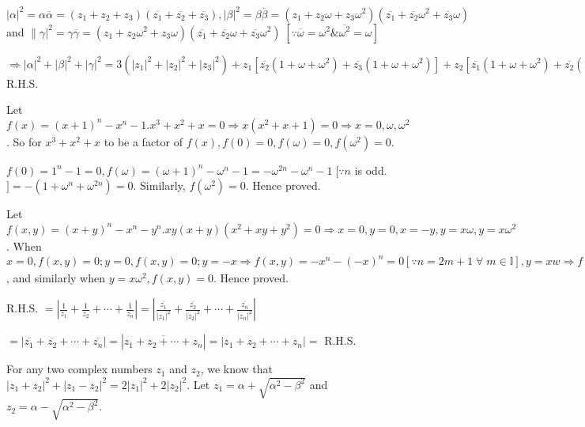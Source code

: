   $|\alpha|^2 = \alpha\overline{\alpha} = (z_1 + z_2 + z_3)(\overline{z_1} + \overline{z_2} +
  \overline{z_3}), |\beta|^2 = \beta\overline{\beta} = (z_1 + z_2\omega + z_3\omega^2)(\overline{z_1} +
  \overline{z_2}\omega^2 + \overline{z_3}\omega)$ and $\|\gamma|^2 = \gamma\overline{\gamma} = (z_1 +
  z_2\omega^2 + z_3\omega)(\overline{z_1} + \overline{z_2}\omega + \overline{z_3}\omega^2)\;[\because
    \overline{\omega} = \omega^2 \& \overline{\omega^2} = \omega]$

  $\Rightarrow |\alpha|^2 + |\beta|^2 + |\gamma|^2 = 3(|z_1|^2 + |z_2|^2 + |z_3|^2) + z_1[\overline{z_2}(1 +
    \omega + \omega^2) + \overline{z_3}(1 + \omega + \omega^2)] + z_2[\overline{z_1}(1 + \omega + \omega^2)
    + \overline{z_2}(1 + \omega + \omega^2)] + z_3[\overline{z_1}(1 + \omega + \omega^2) + \overline{z_2}(1
    + \omega + \omega^2)] = 3(|z_1|^2 + |z_2|^2 + |z_3|^2) =$ R.H.S.
\item Let $f(x) = (x + 1)^n - x^n - 1. x^3 + x^2 + x = 0 \Rightarrow x(x^2 + x + 1) = 0\Rightarrow x = 0,
  \omega, \omega^2$. So for $x^3 + x^2 + x$ to be a factor of $f(x), f(0) = 0, f(\omega) = 0, f(\omega^2) =
  0$.

  $f(0) = 1^n - 1 = 0, f(\omega) = (\omega + 1)^n - \omega^n - 1 = -\omega^{2n} - \omega^n - 1\;[\because n$
    is odd. $] = -(1 + \omega^n + \omega^{2n}) = 0$. Similarly, $f(\omega^2) = 0$. Hence proved.
\item Let $f(x, y) = (x + y)^n - x^n - y^n. xy(x + y)(x^2 + xy + y^2) = 0 \Rightarrow x = 0, y = 0, x = -y, y =
  x\omega, y = x\omega^2$. When $x = 0, f(x, y) = 0; y = 0, f(x, y) = 0; y = -x \Rightarrow f(x, y) = -x^n -(-x)^n =
  0 [\because n = 2m + 1\;\forall\;m\in\mathbb{I}], y = xw \Rightarrow f(x, y) = [x^n(1 + \omega)^n - x^n -
    x^n\omega^n] = -x^n\omega^{2n} - x^n - x^n\omega^n = 0$, and similarly when $y = x\omega^2, f(x, y) =
  0$. Hence proved.
\item R.H.S. $= \left|\frac{1}{z_1} + \frac{1}{z_2} + \cdots + \frac{1}{z_n}\right| =
  \left|\frac{\overline{z_1}}{|z_1|^2} + \frac{\overline{z_2}}{|z_2|^2} + \cdots +
  \frac{\overline{z_n}}{|z_n|^2}\right|$

  $= |\overline{z_1} + \overline{z_2} + \cdots + \overline{z_n}| = |\overline{z_1 + z_2 + \cdots + z_n}| =
  |z_1 + z_2 + \cdots + z_n| =$ R.H.S.
\item For any two complex numbers $z_1$ and $z_2$, we know that $|z_1 + z_2|^2 + |z_1 - z_2|^2 = 2|z_1|^2 +
  2|z_2|^2$. Let $z_1 = \alpha + \sqrt{\alpha^2 - \beta^2}$ and $z_2 = \alpha - \sqrt{\alpha^2 - \beta^2}$.

